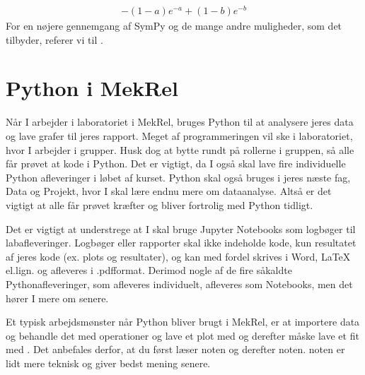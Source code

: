 \documentclass[letterpaper,10pt,english]{jupyterBook}
\begin{document}
\begin{sphinxVerbatim}[commandchars=\\\{\}]
    
   
\end{sphinxVerbatim}
\begin{equation*}
\begin{split}\displaystyle - \left(1 - a\right) e^{- a} + \left(1 - b\right) e^{- b}\end{split}
\end{equation*}
For en nøjere gennemgang af SymPy og de mange andre muligheder, som det tilbyder, referer vi til {\hyperref[\detokenize{notebooks/sympy/Notebook1::doc}]{}}.


\chapter{Python i MekRel}
\label{\detokenize{notebooks/MekRel/Intro_til_MekRel:python-i-mekrel}}\label{\detokenize{notebooks/MekRel/Intro_til_MekRel::doc}}
Når I arbejder i laboratoriet i MekRel, bruges Python til at analysere jeres data og lave grafer til jeres rapport. Meget af
programmeringen vil ske i laboratoriet, hvor I arbejder i grupper. Husk dog at bytte rundt på rollerne i
gruppen, så alle får prøvet at kode i Python. Det er vigtigt, da I også skal lave fire individuelle Python
afleveringer i løbet af kurset. Python skal også bruges i jeres næste fag, Data og Projekt, hvor I skal lære
endnu mere om dataanalyse. Altså er det vigtigt at alle får prøvet kræfter og bliver fortrolig med Python
tidligt.

Det er vigtigt at understrege at I  skal bruge Jupyter Notebooks som logbøger til labafleveringer.
Logbøger eller rapporter skal ikke indeholde kode, kun resultatet af jeres kode (ex. plots og resultater), og kan
med fordel skrives i Word, LaTeX el.lign. og  afleveres i .pdf\sphinxhyphen{}format. Derimod  nogle af de fire såkaldte
Pythonafleveringer, som afleveres individuelt,  afleveres som Notebooks, men det hører I mere om
senere.

Et typisk arbejdsmønster når Python bliver brugt i MekRel, er at importere data og behandle det med 
operationer og lave et plot med  og derefter måske lave et fit med . Det anbefales derfor, at du først læser \sphinxhyphen{}noten og derefter \sphinxhyphen{}noten. \sphinxhyphen{}noten er lidt mere teknisk og giver
bedst mening senere.
\end{document}
